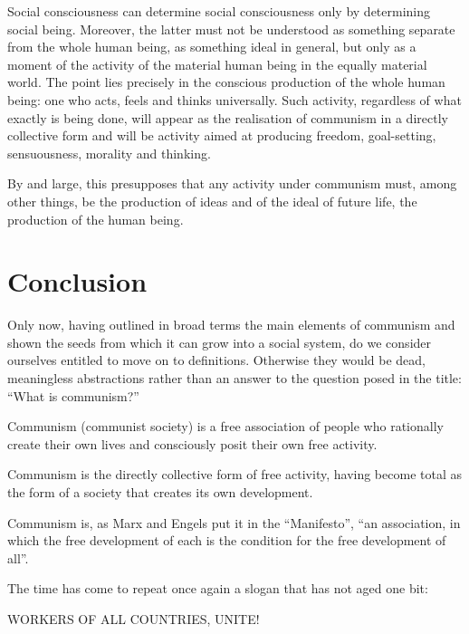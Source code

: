 \documentclass[12pt,a4paper,openany]{book}
\begin{document}
Social consciousness can determine social consciousness only by determining social being. Moreover, the latter must not be understood as something separate from the whole human being, as something ideal in general, but only as a moment of the activity of the material human being in the equally material world. The point lies precisely in the conscious production of the whole human being: one who acts, feels and thinks universally. Such activity, regardless of what exactly is being done, will appear as the realisation of communism in a directly collective form and will be activity aimed at producing freedom, goal-setting, sensuousness, morality and thinking.

By and large, this presupposes that any activity under communism must, among other things, be the production of ideas and of the ideal of future life, the production of the human being.
\ifSubfilesClassLoaded{\setcounter{page}{62}}{}
\section{Conclusion}
\label{sec:11_conclusion}

Only now, having outlined in broad terms the main elements of communism and shown the seeds from which it can grow into a social system, do we consider ourselves entitled to move on to definitions. Otherwise they would be dead, meaningless abstractions rather than an answer to the question posed in the title: “What is communism?”

Communism (communist society) is a free association of people who rationally create their own lives and consciously posit their own free activity.

Communism is the directly collective form of free activity, having become total as the form of a society that creates its own development.

Communism is, as Marx and Engels put it in the “Manifesto”, “an association, in which the free development of each is the condition for the free development of all”.

The time has come to repeat once again a slogan that has not aged one bit:

WORKERS OF ALL COUNTRIES, UNITE!
\end{document}
